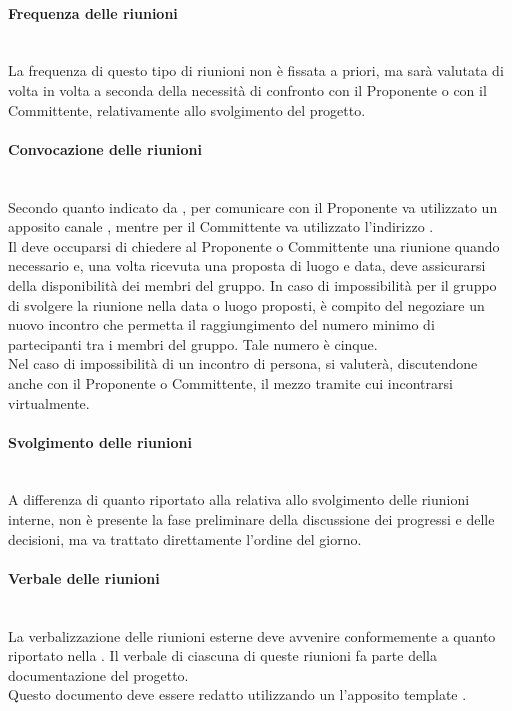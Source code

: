 \paragraph{Frequenza delle riunioni}\mbox{}\\
La frequenza di questo tipo di riunioni non è fissata a priori, ma sarà valutata di volta in volta a seconda della necessità di confronto con il Proponente o con il Committente, relativamente allo svolgimento del progetto.

\paragraph{Convocazione delle riunioni}\mbox{}\\
Secondo quanto indicato da \Proponente, per comunicare con il Proponente va utilizzato un apposito canale , mentre per il Committente va utilizzato l'indirizzo \email{} \href{mailto:\GroupEmail}{\GroupEmail}.\\
Il \Responsabile{} deve occuparsi di chiedere al Proponente o Committente una riunione quando necessario e, una volta ricevuta una proposta di luogo e data, deve assicurarsi della disponibilità dei membri del gruppo. In caso di impossibilità per il gruppo di svolgere la riunione nella data o luogo proposti, è compito del \Responsabile{} negoziare un nuovo incontro che permetta il raggiungimento del numero minimo di partecipanti tra i membri del gruppo. Tale numero è cinque.\\
Nel caso di impossibilità di un incontro di persona, si valuterà, discutendone anche con il Proponente o Committente, il mezzo tramite cui incontrarsi virtualmente.

\paragraph{Svolgimento delle riunioni}\mbox{}\\
A differenza di quanto riportato alla  relativa allo svolgimento delle riunioni interne, non è presente la fase preliminare della discussione dei progressi e delle decisioni, ma va trattato direttamente l'ordine del giorno.

\paragraph{Verbale delle riunioni}\mbox{}\\
La verbalizzazione delle riunioni esterne deve avvenire conformemente a quanto riportato nella . Il verbale di ciascuna di queste riunioni fa parte della documentazione del progetto.\\
Questo documento deve essere redatto utilizzando un l'apposito template \glossario{\LaTeX{}}.

